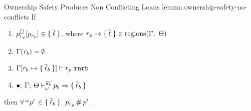 \begin{oxlemma}{Ownership Safety Produces Non Conflicting Loans}
  {lemma:ownership-safety-no-conflicts}
  If
  \begin{enumerate}
  \item $p^\square_{r_p}[p_{r_p}] \in \{ \: \overline{\ell} \: \}$,
    where $r_p \mapsto \{ \: \overline{\ell} \: \} \in \textrm{regions}(\Gamma,\ \Theta)$
  \item $\Gamma(r_b) = \emptyset$
  \item $\Gamma[r_b \mapsto \{ \: \overline{\ell}_b \: \}] \vdash r_p \ \mathtt{rnrb}$
  \item $\bullet; \: \Gamma; \: \Theta \vdash^{\overline{\pi_b}}_{\omega} p_b \Rightarrow \{ \: \overline{\ell}_b \: \}$
  \end{enumerate}
  then $\forall \,^{\omega}p^\prime\, \in \{ \: \overline{\ell}_b \: \}$.
  $p_{r_p} \, \# \, p^\prime$.
\end{oxlemma}
